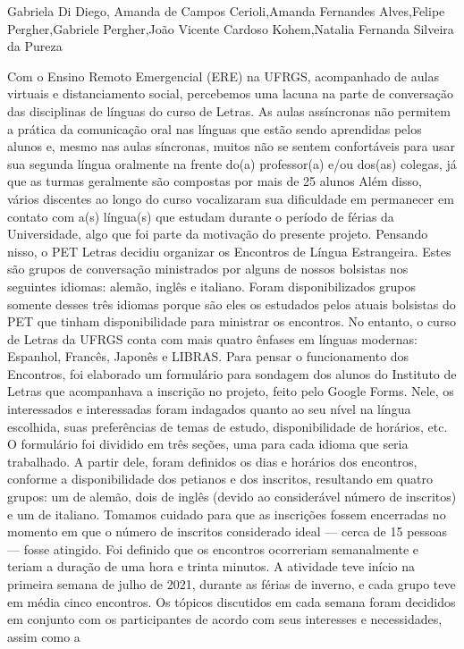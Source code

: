 Gabriela Di Diego, Amanda de Campos Cerioli,Amanda Fernandes Alves,Felipe Pergher,Gabriele Pergher,João Vicente Cardoso Kohem,Natalia Fernanda Silveira da Pureza

Com o Ensino Remoto Emergencial (ERE) na UFRGS, acompanhado de aulas virtuais e
distanciamento social, percebemos uma lacuna na parte de conversação das disciplinas de
línguas do curso de Letras. As aulas assíncronas não permitem a prática da comunicação oral nas
línguas que estão sendo aprendidas pelos alunos e, mesmo nas aulas síncronas, muitos não se
sentem confortáveis para usar sua segunda língua oralmente na frente do(a) professor(a) e/ou
dos(as) colegas, já que as turmas geralmente são compostas por mais de 25 alunos Além disso,
vários discentes ao longo do curso vocalizaram sua dificuldade em permanecer em contato com
a(s) língua(s) que estudam durante o período de férias da Universidade, algo que foi parte da
motivação do presente projeto.
Pensando nisso, o PET Letras decidiu organizar os Encontros de Língua Estrangeira. Estes
são grupos de conversação ministrados por alguns de nossos bolsistas nos seguintes idiomas:
alemão, inglês e italiano. Foram disponibilizados grupos somente desses três idiomas porque são
eles os estudados pelos atuais bolsistas do PET que tinham disponibilidade para ministrar os
encontros. No entanto, o curso de Letras da UFRGS conta com mais quatro ênfases em línguas
modernas: Espanhol, Francês, Japonês e LIBRAS.
Para pensar o funcionamento dos Encontros, foi elaborado um formulário para sondagem dos
alunos do Instituto de Letras que acompanhava a inscrição no projeto, feito pelo Google Forms.
Nele, os interessados e interessadas foram indagados quanto ao seu nível na língua escolhida,
suas preferências de temas de estudo, disponibilidade de horários, etc. O formulário foi dividido
em três seções, uma para cada idioma que seria trabalhado. A partir dele, foram definidos os dias
e horários dos encontros, conforme a disponibilidade dos petianos e dos inscritos, resultando em
quatro grupos: um de alemão, dois de inglês (devido ao considerável número de inscritos) e um
de italiano. Tomamos cuidado para que as inscrições fossem encerradas no momento em que o
número de inscritos considerado ideal — cerca de 15 pessoas — fosse atingido. Foi definido que
os encontros ocorreriam semanalmente e teriam a duração de uma hora e trinta minutos. A
atividade teve início na primeira semana de julho de 2021, durante as férias de inverno, e cada
grupo teve em média cinco encontros. Os tópicos discutidos em cada semana foram decididos
em conjunto com os participantes de acordo com seus interesses e necessidades, assim como a
